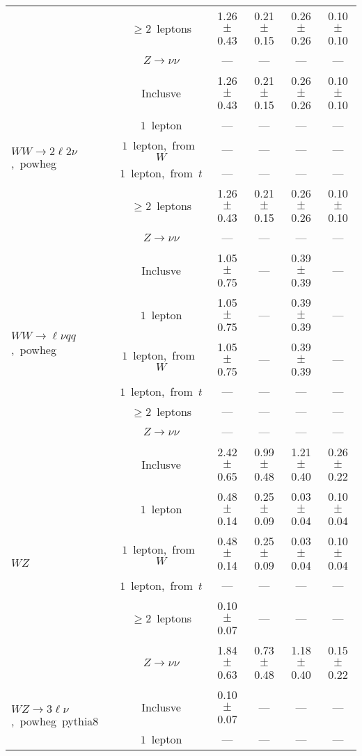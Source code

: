 \documentclass{article}
\begin{document}
\begin{longtable}{|l|c|c|c|c|c|}
 & $\ge2$~leptons  & 1.26 $\pm$ 0.43  & 0.21 $\pm$ 0.15  & 0.26 $\pm$ 0.26  & 0.10 $\pm$ 0.10 \\* 
 & $Z\rightarrow\nu\nu$  & ---  & ---  & ---  & --- \\* 
\hline 
\multirow{6}{*}{$WW{\rightarrow}2\ell2\nu$,~powheg} & Inclusve  & 1.26 $\pm$ 0.43  & 0.21 $\pm$ 0.15  & 0.26 $\pm$ 0.26  & 0.10 $\pm$ 0.10 \\* 
 & $1$~lepton  & ---  & ---  & ---  & --- \\* 
 & $1$~lepton,~from~$W$  & ---  & ---  & ---  & --- \\* 
 & $1$~lepton,~from~$t$  & ---  & ---  & ---  & --- \\* 
 & $\ge2$~leptons  & 1.26 $\pm$ 0.43  & 0.21 $\pm$ 0.15  & 0.26 $\pm$ 0.26  & 0.10 $\pm$ 0.10 \\* 
 & $Z\rightarrow\nu\nu$  & ---  & ---  & ---  & --- \\* 
\hline 
\multirow{6}{*}{$WW{\rightarrow}{\ell}{\nu}qq$,~powheg} & Inclusve  & 1.05 $\pm$ 0.75  & ---  & 0.39 $\pm$ 0.39  & --- \\* 
 & $1$~lepton  & 1.05 $\pm$ 0.75  & ---  & 0.39 $\pm$ 0.39  & --- \\* 
 & $1$~lepton,~from~$W$  & 1.05 $\pm$ 0.75  & ---  & 0.39 $\pm$ 0.39  & --- \\* 
 & $1$~lepton,~from~$t$  & ---  & ---  & ---  & --- \\* 
 & $\ge2$~leptons  & ---  & ---  & ---  & --- \\* 
 & $Z\rightarrow\nu\nu$  & ---  & ---  & ---  & --- \\* 
\hline 
\multirow{6}{*}{$WZ$} & Inclusve  & 2.42 $\pm$ 0.65  & 0.99 $\pm$ 0.48  & 1.21 $\pm$ 0.40  & 0.26 $\pm$ 0.22 \\* 
 & $1$~lepton  & 0.48 $\pm$ 0.14  & 0.25 $\pm$ 0.09  & 0.03 $\pm$ 0.04  & 0.10 $\pm$ 0.04 \\* 
 & $1$~lepton,~from~$W$  & 0.48 $\pm$ 0.14  & 0.25 $\pm$ 0.09  & 0.03 $\pm$ 0.04  & 0.10 $\pm$ 0.04 \\* 
 & $1$~lepton,~from~$t$  & ---  & ---  & ---  & --- \\* 
 & $\ge2$~leptons  & 0.10 $\pm$ 0.07  & ---  & ---  & --- \\* 
 & $Z\rightarrow\nu\nu$  & 1.84 $\pm$ 0.63  & 0.73 $\pm$ 0.48  & 1.18 $\pm$ 0.40  & 0.15 $\pm$ 0.22 \\* 
\hline 
\multirow{6}{*}{$WZ{\rightarrow}3\ell\nu$,~powheg~pythia8} & Inclusve  & 0.10 $\pm$ 0.07  & ---  & ---  & --- \\* 
 & $1$~lepton  & ---  & ---  & ---  & --- \\* 

\end{longtable}
\end{document}
